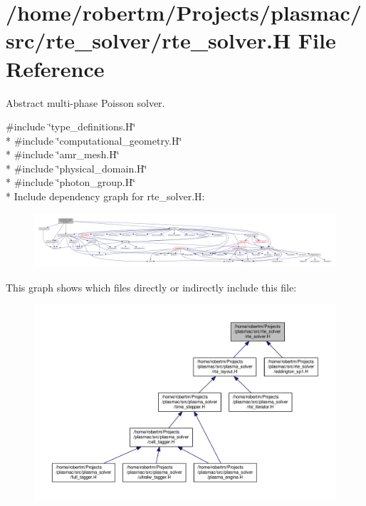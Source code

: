\hypertarget{rte__solver_8H}{}\section{/home/robertm/\+Projects/plasmac/src/rte\+\_\+solver/rte\+\_\+solver.H File Reference}
\label{rte__solver_8H}


Abstract multi-\/phase Poisson solver.  


{\ttfamily \#include \char`\"{}type\+\_\+definitions.\+H\char`\"{}}\\*
{\ttfamily \#include \char`\"{}computational\+\_\+geometry.\+H\char`\"{}}\\*
{\ttfamily \#include \char`\"{}amr\+\_\+mesh.\+H\char`\"{}}\\*
{\ttfamily \#include \char`\"{}physical\+\_\+domain.\+H\char`\"{}}\\*
{\ttfamily \#include \char`\"{}photon\+\_\+group.\+H\char`\"{}}\\*
Include dependency graph for rte\+\_\+solver.\+H\+:\nopagebreak
\begin{figure}[H]
\begin{center}
\leavevmode
\includegraphics[width=350pt]{rte__solver_8H__incl}
\end{center}
\end{figure}
This graph shows which files directly or indirectly include this file\+:\nopagebreak
\begin{figure}[H]
\begin{center}
\leavevmode
\includegraphics[width=350pt]{rte__solver_8H__dep__incl}
\end{center}
\end{figure}
